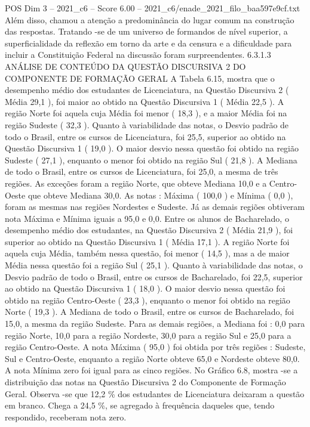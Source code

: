 \begin{textsample}{POS Dim 3 – 2021\_c6 – Score 6.00 – 2021\_c6/enade\_2021\_filo\_baa597e9cf.txt}
Além disso, chamou a atenção a predominância do lugar comum na construção das respostas.
Tratando -se de um universo de formandos de nível superior, a superficialidade da reflexão em torno da arte e da censura e a dificuldade para incluir a Constituição Federal na discussão foram surpreendentes. 6.3.1.3 ANÁLISE DE CONTEÚDO DA QUESTÃO DISCURSIVA 2 DO COMPONENTE DE FORMAÇÃO GERAL A Tabela 6.15, mostra que o desempenho médio dos estudantes de Licenciatura, na Questão Discursiva 2 ( Média 29,1 ), foi maior ao obtido na Questão Discursiva 1 ( Média 22,5 ).
A região Norte foi aquela cuja Média foi menor ( 18,3 ), e a maior Média foi na região Sudeste ( 32,3 ).
Quanto à variabilidade das notas, o Desvio padrão de todo o Brasil, entre os cursos de Licenciatura, foi 25,5, superior ao obtido na Questão Discursiva 1 ( 19,0 ).
O maior desvio nessa questão foi obtido na região Sudeste ( 27,1 ), enquanto o menor foi obtido na região Sul ( 21,8 ).
A Mediana de todo o Brasil, entre os cursos de Licenciatura, foi 25,0, a mesma de três regiões.
As exceções foram a região Norte, que obteve Mediana 10,0 e a Centro-Oeste que obteve Mediana 30,0.
As notas : Máxima ( 100,0 ) e Mínima ( 0,0 ), foram as mesmas nas regiões Nordestes e Sudeste.
Já as demais regiões obtiveram nota Máxima e Mínima iguais a 95,0 e 0,0.
Entre os alunos de Bacharelado, o desempenho médio dos estudantes, na Questão Discursiva 2 ( Média 21,9 ), foi superior ao obtido na Questão Discursiva 1 ( Média 17,1 ).
A região Norte foi aquela cuja Média, também nessa questão, foi menor ( 14,5 ), mas a de maior Média nessa questão foi a região Sul ( 25,1 ).
Quanto à variabilidade das notas, o Desvio padrão de todo o Brasil, entre os cursos de Bacharelado, foi 22,5, superior ao obtido na Questão Discursiva 1 ( 18,0 ).
O maior desvio nessa questão foi obtido na região Centro-Oeste ( 23,3 ), enquanto o menor foi obtido na região Norte ( 19,3 ).
A Mediana de todo o Brasil, entre os cursos de Bacharelado, foi 15,0, a mesma da região Sudeste.
Para as demais regiões, a Mediana foi : 0,0 para região Norte, 10,0 para a região Nordeste, 30,0 para a região Sul e 25,0 para a região Centro-Oeste.
A nota Máxima ( 95,0 ) foi obtida por três regiões : Sudeste, Sul e Centro-Oeste, enquanto a região Norte obteve 65,0 e Nordeste obteve 80,0.
A nota Mínima zero foi igual para as cinco regiões.
No Gráfico 6.8, mostra -se a distribuição das notas na Questão Discursiva 2 do Componente de Formação Geral.
Observa -se que 12,2 \% dos estudantes de Licenciatura deixaram a questão em branco.
Chega a 24,5 \%, se agregado à frequência daqueles que, tendo respondido, receberam nota zero.

\end{textsample}
